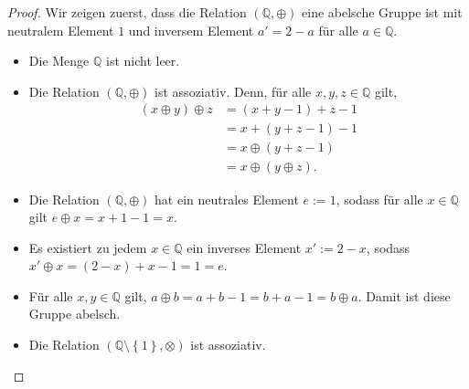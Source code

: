\documentclass[12pt]{extarticle}
\newcommand{\mg}[1]{\mathbb{#1}}
\begin{document}
\begin{proof}
  Wir zeigen zuerst, dass die Relation \((\mg{Q}, \oplus)\) eine
  abelsche Gruppe ist mit neutralem Element \(1\) und inversem Element
  \(a'=2-a\) für alle \(a \in \mg{Q}\).

  \begin{itemize}
  \item Die Menge \(\mg{Q}\) ist nicht leer.
  \item Die Relation \((\mg{Q}, \oplus)\) ist assoziativ.
    Denn, für alle \(x, y, z \in \mg{Q}\) gilt,
\begin{align*}
  (x \oplus y) \oplus z &= (x+y-1)+z-1\\
                        &= x+(y+z-1)-1\\
                        &= x \oplus(y+z-1)\\
  &= x \oplus(y\oplus z).
\end{align*}
\item  Die Relation \((\mg{Q}, \oplus)\) hat ein neutrales Element
  \(e:=1\), sodass für alle \(x \in \mg{Q}\) gilt $e \oplus x = x + 1 -
  1 =x$.
\item Es existiert zu jedem \(x \in \mg{Q}\) ein inverses Element
  \(x':=2-x\), sodass \(x' \oplus x=(2-x) + x - 1 = 1 = e\).
\item Für alle \(x, y \in \mg{Q}\) gilt, $a \oplus b = a + b - 1 = b
  + a - 1 = b \oplus a$.  Damit ist diese Gruppe abelsch.
\item Die Relation \((\mg{Q}\setminus \left\{ 1 \right\}, \otimes)\)
  ist assoziativ.


\end{itemize}
\end{proof}
\end{document}
